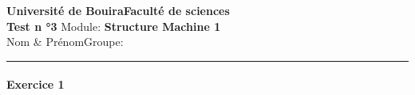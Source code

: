 \documentclass[tikz,11pt,a4paper,booktabs,notitlepage]{report}
\author{Taha Zerrouki}
\begin{document}
\textbf{Université de Bouira}\hfill \textbf{Faculté de sciences}\\[8pt]
\textbf{\LARGE{Test n °3}} \hfill Module: \textbf{Structure Machine 1}\\[5pt]
\large{Nom \& Prénom}\dotfill \hfill \large{Groupe:}\dotfill\\
\rule{\textwidth}{1pt}

\paragraph{Exercice 1}


%
%
%

\end{document}
